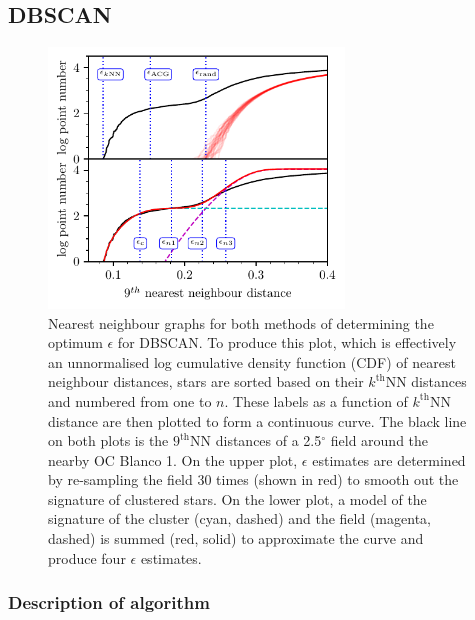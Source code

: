 \subsection{DBSCAN}

\begin{figure}[t]
   \centering
   \includegraphics[width=0.7\textwidth]{fig/c2/fig_dbscan.pdf}
   \caption[Nearest neighbour graphs for both methods of determining the optimum $\epsilon$ for DBSCAN]{Nearest neighbour graphs for both methods of determining the optimum $\epsilon$ for DBSCAN. To produce this plot, which is effectively an unnormalised log cumulative density function (CDF) of nearest neighbour distances, stars are sorted based on their $k^{\text{th}}$NN distances and numbered from one to $n$. These labels as a function of $k^{\text{th}}$NN distance are then plotted to form a continuous curve. The black line on both plots is the $9^{\text{th}}$NN distances of a 2.5$^\circ$ field around the nearby OC Blanco 1. On the upper plot, $\epsilon$ estimates are determined by re-sampling the field 30 times (shown in red) to smooth out the signature of clustered stars. On the lower plot, a model of the signature of the cluster (cyan, dashed) and the field (magenta, dashed) is summed (red, solid) to approximate the curve and produce four $\epsilon$ estimates.}\label{c2:fig:dbscan}%
\end{figure}

\subsubsection{Description of algorithm}

